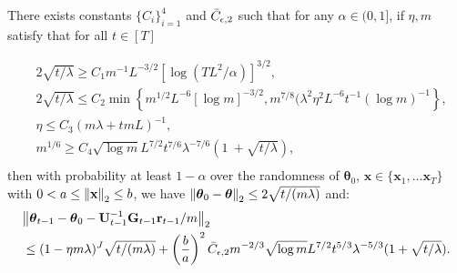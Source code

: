 \begin{auxlemma}
\label{lemma:neural-bo_lin_vs_regresion}
There exists constants $\{C_i\}^4_{i=1}$ and $\Bar{C}_{\epsilon,2}$ such that for
any $\alpha \in (0,1]$, if $\eta, m$ satisfy that for all $t \in [T]$ 

\begin{equation*}
\begin{split}
    & 2\sqrt{t/\lambda}\ge C_{1}m^{-1}L^{-3/2}\left[\log(T L^{2}/\alpha)\right]^{3/2}, \\
    & 2\sqrt{t/\lambda}\leq C_{2}\operatorname*{min}\left\{m^{1/2}L^{-6}[\log m]^{-3/2},m^{7/8}(\lambda^2 \eta^2L^{-6}t^{-1}(\log m)^{-1}\right\},\\
    & \eta\le C_{3}(m\lambda+t m L)^{-1}, \\
    & m^{1/6}\ge C_{4}\sqrt{\log m}L^{7/2}t^{7/6}\lambda^{-7/6}(1\ +\sqrt{t/\lambda}), \\
\end{split}
\end{equation*}
then with probability at least $1-\alpha$ over the randomness of $\boldsymbol{\theta}_0$, $\mathbf{x} \in \{\mathbf{x}_1, \dots \mathbf{x}_T\}$ with $0<  a \le \norm{\mathbf{x}}_2 \le b$, we have $\norm{\boldsymbol{\theta}_0 -  \boldsymbol{\theta}}_2 \le 2{\sqrt{t/(m\lambda)}}$ and:
\begin{align*}
            &\norm{\boldsymbol{\theta}_{t-1} - \boldsymbol{\theta}_0 - \mathbf{U}^{-1}_{t-1}\mathbf{G}_{t-1} \mathbf{r}_{t-1}/m}_2\\
         & \leq(1-\eta m\lambda)^{J}\sqrt{t/(m\lambda)}+\left(\frac{b}{a}\right)^2 \Bar{C}_{\epsilon, 2}m^{-2/3}\sqrt{\log m}L^{7/2}t^{5/3}\lambda^{-5/3}(1+\sqrt{t/\lambda}).
    \end{align*}
\end{auxlemma}

